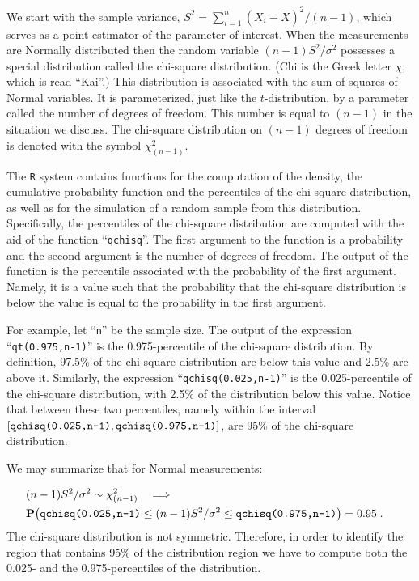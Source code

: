 \documentclass[
]{krantz}
\newcommand{\Prob}{\mathbf{P}}
\theoremstyle{definition}
\theoremstyle{definition}
\theoremstyle{definition}
\theoremstyle{remark}
\begin{document}
We start with the sample variance,
\(S^2 = \sum_{i=1}^n (X_i - \bar X)^2/(n-1)\), which serves as a point
estimator of the parameter of interest. When the measurements are
Normally distributed then the random variable \((n-1)S^2/\sigma^2\)
possesses a special distribution called the chi-square distribution.
(Chi is the Greek letter \(\chi\), which is read ``Kai''.) This distribution
is associated with the sum of squares of Normal variables. It is
parameterized, just like the \(t\)-distribution, by a parameter called the
number of degrees of freedom. This number is equal to \((n-1)\) in the
situation we discuss. The chi-square distribution on \((n-1)\) degrees of
freedom is denoted with the symbol \(\chi^2_{(n-1)}\).

The \texttt{R} system contains functions for the computation of the density,
the cumulative probability function and the percentiles of the
chi-square distribution, as well as for the simulation of a random
sample from this distribution. Specifically, the percentiles of the
chi-square distribution are computed with the aid of the function
``\texttt{qchisq}''. The first argument to the function is a probability and the
second argument is the number of degrees of freedom. The output of the
function is the percentile associated with the probability of the first
argument. Namely, it is a value such that the probability that the
chi-square distribution is below the value is equal to the probability
in the first argument.

For example, let ``\texttt{n}'' be the sample size. The output of the expression
``\texttt{qt(0.975,n-1)}'' is the 0.975-percentile of the chi-square
distribution. By definition, 97.5\% of the chi-square distribution are
below this value and 2.5\% are above it. Similarly, the expression
``\texttt{qchisq(0.025,n-1)}'' is the 0.025-percentile of the chi-square
distribution, with 2.5\% of the distribution below this value. Notice
that between these two percentiles, namely within the interval
\([\mbox{\texttt{qchisq(0.025,n-1)}}, \mbox{\texttt{qchisq(0.975,n-1)}}]\),
are 95\% of the chi-square distribution.

We may summarize that for Normal measurements:

\[\begin{aligned}
\lefteqn{(n-1)S^2/\sigma^2 \sim \chi^2_{(n-1)} \quad \Longrightarrow }\\ & \Prob \big( \mbox{\texttt{qchisq(0.025,n-1)}} \leq (n-1)S^2/\sigma^2  \leq \mbox{\texttt{qchisq(0.975,n-1)}} \big) = 0.95\;.\end{aligned}\]
The chi-square distribution is not symmetric. Therefore, in order to
identify the region that contains 95\% of the distribution region we have
to compute both the 0.025- and the 0.975-percentiles of the
distribution.
\end{document}
